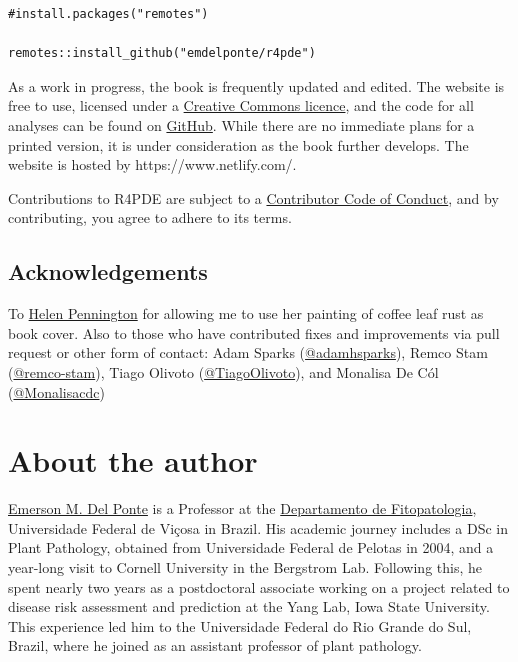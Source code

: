 \documentclass[
  letterpaper,
]{book}
\begin{document}
\begin{verbatim}
#install.packages("remotes")

remotes::install_github("emdelponte/r4pde")
\end{verbatim}

As a work in progress, the book is frequently updated and edited. The
website is free to use, licensed under a
\href{https://creativecommons.org/licenses/by-nc/4.0/}{Creative Commons
licence}, and the code for all analyses can be found on
\href{https://github.com/emdelponte/epidemiology-R}{GitHub}. While there
are no immediate plans for a printed version, it is under consideration
as the book further develops. The website is hosted by
https://www.netlify.com/.

Contributions to R4PDE are subject to a
\href{https://contributor-covenant.org/version/2/0/CODE_OF_CONDUCT.html}{Contributor
Code of Conduct}, and by contributing, you agree to adhere to its terms.

\hypertarget{acknowledgements}{%
\section*{Acknowledgements}\label{acknowledgements}}


To \href{https://www.hgpenningtonart.co.uk/}{Helen Pennington} for
allowing me to use her painting of coffee leaf rust as book cover. Also
to those who have contributed fixes and improvements via pull request or
other form of contact: Adam Sparks
(\href{https://github.com/adamhsparks}{@adamhsparks}), Remco Stam
(\href{https://github.com/remco-stam}{@remco-stam}), Tiago Olivoto
(\href{https://github.com/TiagoOlivoto}{@TiagoOlivoto}), and Monalisa De
Cól (\href{https://github.com/Monalisacdc}{@Monalisacdc})


\hypertarget{about-the-author}{%
\chapter*{About the author}\label{about-the-author}}


\href{https://emersondelponte.netlify.app/}{Emerson M. Del Ponte} is a
Professor at the
\href{http://www.dfp.ufv.br/graduate/faculty/}{Departamento de
Fitopatologia}, Universidade Federal de Viçosa in Brazil. His academic
journey includes a DSc in Plant Pathology, obtained from Universidade
Federal de Pelotas in 2004, and a year-long visit to Cornell University
in the Bergstrom Lab. Following this, he spent nearly two years as a
postdoctoral associate working on a project related to disease risk
assessment and prediction at the Yang Lab, Iowa State University. This
experience led him to the Universidade Federal do Rio Grande do Sul,
Brazil, where he joined as an assistant professor of plant pathology.
\end{document}
